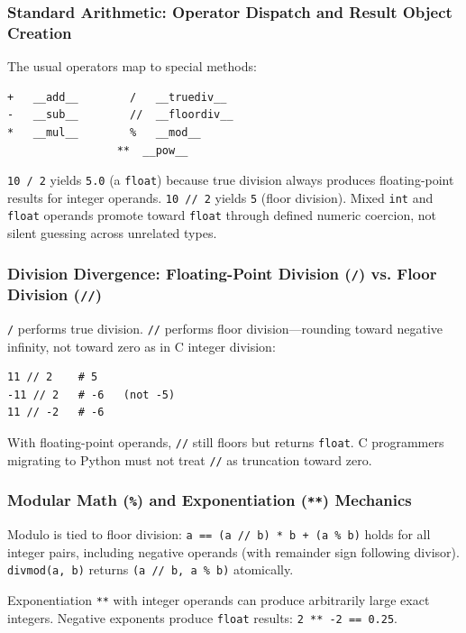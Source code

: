\documentclass[a4paper,twoside]{report}
\begin{document}
\subsubsection{Standard Arithmetic: Operator Dispatch and Result Object Creation}

The usual operators map to special methods:

\begin{verbatim}
+   __add__        /   __truediv__
-   __sub__        //  __floordiv__
*   __mul__        %   __mod__
                 **  __pow__
\end{verbatim}

\texttt{10 / 2} yields \texttt{5.0} (a \texttt{float}) because true division always produces floating-point results for integer operands. \texttt{10 // 2} yields \texttt{5} (floor division). Mixed \texttt{int} and \texttt{float} operands promote toward \texttt{float} through defined numeric coercion, not silent guessing across unrelated types.

\subsubsection{Division Divergence: Floating-Point Division (\texttt{/}) vs. Floor Division (\texttt{//})}

\texttt{/} performs true division. \texttt{//} performs floor division---rounding toward negative infinity, not toward zero as in C integer division:

\begin{verbatim}
11 // 2    # 5
-11 // 2   # -6   (not -5)
11 // -2   # -6
\end{verbatim}

With floating-point operands, \texttt{//} still floors but returns \texttt{float}. C programmers migrating to Python must not treat \texttt{//} as truncation toward zero.

\subsubsection{Modular Math (\texttt{\%}) and Exponentiation (\texttt{**}) Mechanics}

Modulo is tied to floor division: \texttt{a == (a // b) * b + (a \% b)} holds for all integer pairs, including negative operands (with remainder sign following divisor). \texttt{divmod(a, b)} returns \texttt{(a // b, a \% b)} atomically.

Exponentiation \texttt{**} with integer operands can produce arbitrarily large exact integers. Negative exponents produce \texttt{float} results: \texttt{2 ** -2 == 0.25}.
\end{document}

